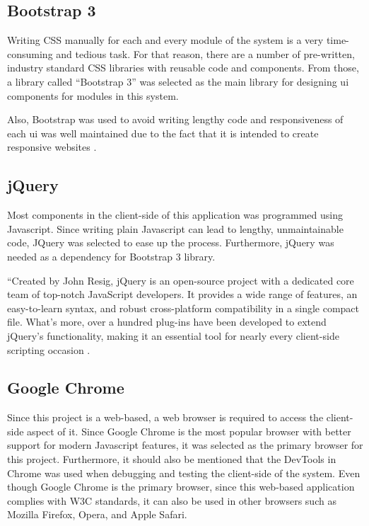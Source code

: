 \documentclass[12pt]{report}
\begin{document}
\subsection{Bootstrap 3}
Writing CSS manually for each and every module of the system is a very time-consuming and tedious task. For that reason, there are a number of pre-written, industry standard CSS libraries with reusable code and components. From those, a library called ``Bootstrap 3'' was selected as the main library for designing \acrshort{ui} components for modules in this system.

Also, Bootstrap was used to avoid writing lengthy code and responsiveness of each \acrshort{ui} was well maintained due to the fact that it is intended to create responsive websites \cite{chahal_2019_bootstrap}.

\subsection{jQuery}
Most components in the client-side of this application was programmed using Javascript. Since writing plain Javascript can lead to lengthy, unmaintainable code, JQuery was selected to ease up the process. Furthermore, jQuery was needed as a dependency for Bootstrap 3 library.

``Created by John Resig, jQuery is an open-source project with a dedicated core team of top-notch JavaScript developers. It provides a wide range of features, an easy-to-learn syntax, and robust cross-platform compatibility in a single compact file. What's
more, over a hundred plug-ins have been developed to extend jQuery's functionality, making it an essential tool for nearly every client-side scripting occasion \cite{chaffer_2007_jquery}.

\subsection{Google Chrome}
Since this project is a web-based, a web browser is required to access the client-side aspect of it. Since Google Chrome is the most popular browser with better support for modern Javascript features, it was selected as the primary browser for this project. Furthermore, it should also be mentioned that the DevTools in Chrome was used when debugging and testing the client-side of the system. Even though Google Chrome is the primary browser, since this web-based application complies with W3C standards, it can also be used in other browsers such as Mozilla Firefox, Opera, and Apple Safari.
\end{document}
